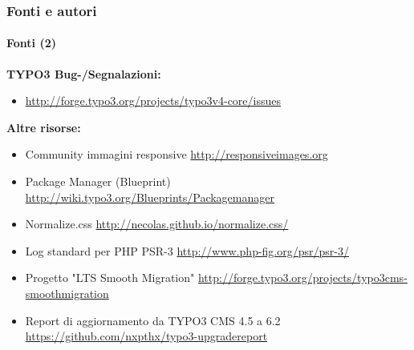 
\begin{frame}[fragile]
	\frametitle{Fonti e autori}
	\framesubtitle{Fonti (2)}

	\textbf{TYPO3 Bug-/Segnalazioni:}
		\begin{itemize}\smaller
			\item \url{http://forge.typo3.org/projects/typo3v4-core/issues}
		\end{itemize}

	\textbf{Altre risorse:}
		\begin{itemize}\smaller

			\item Community immagini responsive\newline
				\url{http://responsiveimages.org}

			\item Package Manager (Blueprint)\newline
				\url{http://wiki.typo3.org/Blueprints/Packagemanager}

			\item Normalize.css\newline
				\url{http://necolas.github.io/normalize.css/}

			\item Log standard per PHP PSR-3\newline
				\url{http://www.php-fig.org/psr/psr-3/}

			\item Progetto "LTS Smooth Migration"\newline
				\url{http://forge.typo3.org/projects/typo3cms-smoothmigration}

			\item Report di aggiornamento da TYPO3 CMS 4.5 a 6.2 
				\url{https://github.com/nxpthx/typo3-upgradereport}

		\end{itemize}

\end{frame}


